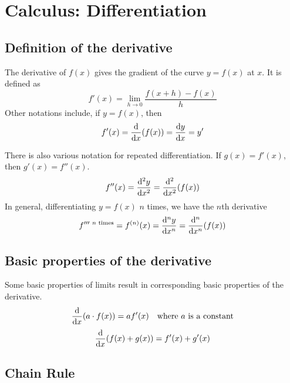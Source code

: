 \section{Calculus: Differentiation}


\subsection{Definition of the derivative}

The derivative of \(f(x)\) gives the gradient of the curve \(y = f(x)\) at
\(x\). It is defined as
\begin{equation}
f'(x) = \lim_{h \to 0} \frac{f(x + h) - f(x)}h
\end{equation}
Other notations include, if \(y = f(x)\), then
\begin{equation}
f'(x) = \dv{x}(f(x)) = \dv{y}{x} = y'
\end{equation}

There is also various notation for repeated differentiation. If
\(g(x) = f'(x)\), then \(g'(x) = f''(x)\).
\begin{equation*}
f''(x) = \dv[2]{y}{x} = \dv[2]{x}(f(x))
\end{equation*}
In general, differentiating \(y = f(x)\) \(n\) times, we have the \(n\)th
derivative
\begin{equation*}
f'''^{\ \text{\(n\) times}} = f^{(n)}(x) = \dv[n]{y}{x} = \dv[n]{x}(f(x))
\end{equation*}

\subsection{Basic properties of the derivative}
\label{sec_calc_derivative_properties}

Some basic properties of limits result in corresponding basic properties of
the derivative.
\begin{equation*}
\dv{x}(a \cdot f(x)) = af'(x) \quad \text{where \(a\) is a constant}
\end{equation*}
\begin{equation*}
\dv{x}(f(x) + g(x)) = f'(x) + g'(x)
\end{equation*}

\subsection{Chain Rule} \label{sec_calc_chain}

